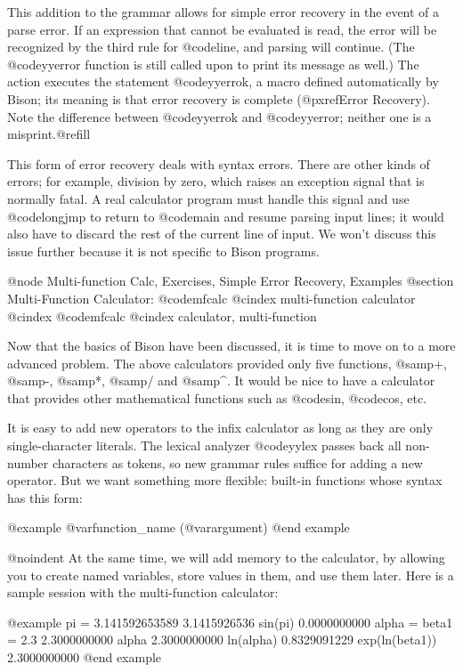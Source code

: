 {{{{{{{{{{This addition to the grammar allows for simple error recovery in the event
of a parse error.  If an expression that cannot be evaluated is read, the
error will be recognized by the third rule for @code{line}, and parsing
will continue.  (The @code{yyerror} function is still called upon to print
its message as well.)  The action executes the statement @code{yyerrok}, a
macro defined automatically by Bison; its meaning is that error recovery is
complete (@pxref{Error Recovery}).  Note the difference between
@code{yyerrok} and @code{yyerror}; neither one is a misprint.@refill

This form of error recovery deals with syntax errors.  There are other
kinds of errors; for example, division by zero, which raises an exception
signal that is normally fatal.  A real calculator program must handle this
signal and use @code{longjmp} to return to @code{main} and resume parsing
input lines; it would also have to discard the rest of the current line of
input.  We won't discuss this issue further because it is not specific to
Bison programs.

@node Multi-function Calc, Exercises, Simple Error Recovery, Examples
@section Multi-Function Calculator: @code{mfcalc}
@cindex multi-function calculator
@cindex @code{mfcalc}
@cindex calculator, multi-function

Now that the basics of Bison have been discussed, it is time to move on to
a more advanced problem.  The above calculators provided only five
functions, @samp{+}, @samp{-}, @samp{*}, @samp{/} and @samp{^}.  It would
be nice to have a calculator that provides other mathematical functions such
as @code{sin}, @code{cos}, etc.

It is easy to add new operators to the infix calculator as long as they are
only single-character literals.  The lexical analyzer @code{yylex} passes
back all non-number characters as tokens, so new grammar rules suffice for
adding a new operator.  But we want something more flexible: built-in
functions whose syntax has this form:

@example
@var{function_name} (@var{argument})
@end example

@noindent
At the same time, we will add memory to the calculator, by allowing you
to create named variables, store values in them, and use them later.
Here is a sample session with the multi-function calculator:

@example
pi = 3.141592653589
3.1415926536
sin(pi)
0.0000000000
alpha = beta1 = 2.3
2.3000000000
alpha
2.3000000000
ln(alpha)
0.8329091229
exp(ln(beta1))
2.3000000000
%
@end example

}}}}}}}}}}
